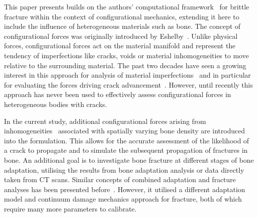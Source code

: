 \documentclass[review]{elsarticle}
\numberwithin{equation}{section}
\begin{document}
This paper presents builds on the authors' computational framework~\citep{kaczmarczyk2017energy} for brittle fracture within the context of configurational mechanics, extending it here to include the influence of heterogeneous materials such as bone.
The concept of configurational forces was originally introduced by Eshelby~\citep{eshelby1951force}. 
Unlike physical forces, configurational forces act on the material manifold and represent the tendency of imperfections like cracks, voids or material inhomogeneities to move relative to the surrounding material. 
The past two decades have seen a growing interest in this approach for analysis of material imperfections~\citep{maugin2016configurational} and in particular for evaluating the forces driving crack advancement~\citep{steinmann2001application, ozencc2016configurational, kaczmarczyk2017energy}. 
However, until recently this approach has never been used to effectively assess configurational forces in heterogeneous bodies with cracks. 

In the current study, additional configurational forces arising from inhomogeneities~\citep{kienzler2014configurational}
associated with spatially varying bone density are introduced into the formulation. This allows for the accurate assessment of the likelihood of a crack to propagate and to simulate  the subsequent propagation of fractures in bone. 
An additional goal is to investigate bone fracture at different stages of bone adaptation, utilising the results from bone adaptation analysis or data directly taken from CT scans. 
Similar concepts of combined adaptation and fracture analyses has been presented before~\citep{hambli2013integrated}. 
However, it utilised a different adaptation model and continuum damage mechanics approach for fracture, both of which require many more parameters to calibrate. 


\end{document}
